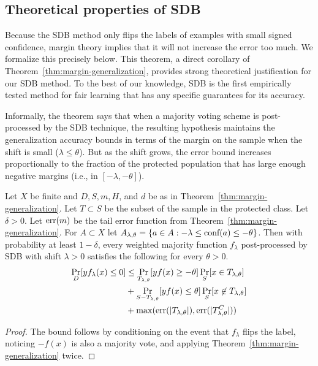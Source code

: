 \documentclass[twoside,leqno,twocolumn]{article}
\begin{document}
\subsection{Theoretical properties of SDB}\label{sec:sdbtheory}

Because the SDB method only flips the labels of examples with small signed
confidence, margin theory implies that it will not increase the error too much.
We formalize this precisely below. This theorem, a direct
corollary of Theorem~\ref{thm:margin-generalization}, provides strong
theoretical justification for our SDB method. To the best of our knowledge,
SDB is the first empirically tested method for fair learning that has any
specific guarantees for its accuracy.

Informally, the theorem says that when a
majority voting scheme is post-processed by the SDB technique, the resulting
hypothesis maintains the generalization accuracy bounds in terms of the margin
on the sample when the shift is small ($\lambda \leq \theta$). But as the shift
grows, the error bound increases proportionally to the fraction of the
protected population that has large enough negative margins (i.e., in
$[-\lambda, -\theta]$).

\begin{theorem} 
Let $X$ be finite and $D,S,m,H$, and $d$ be as in
Theorem~\ref{thm:margin-generalization}. Let $T \subset S$ be the subset of the
sample in the protected class. Let $\delta > 0$. Let $\textup{err}(m)$ be the
tail error function from Theorem~\ref{thm:margin-generalization}. For $A
\subset X$ let $A_{\lambda, \theta} = \{ a \in A : -\lambda \leq
\textup{conf}(a) \leq -\theta \}$. Then with probability at least $1-\delta$,
every weighted majority function $f_\lambda$ post-processed by SDB with shift
$\lambda > 0$ satisfies the following for every $\theta > 0$.
$$
\begin{aligned}\Pr_D[yf_\lambda(x) \leq 0] &\leq 
\Pr_{T_{\lambda, \theta}}[yf(x) \geq -\theta] \Pr_{S}[x \in T_{\lambda,
\theta}] \\ & + 
\Pr_{S - T_{\lambda, \theta}}[yf(x) \leq \theta] \Pr_{S}[x \not \in T_{\lambda,
\theta}] \\ & + 
\max ( \textup{err}(|T_{\lambda, \theta}|), \textup{err}(|T^C_{\lambda,
\theta}|))
\end{aligned}
$$  
\end{theorem}
\begin{proof}
The bound follows by conditioning on the event that $f_\lambda$ flips the
label, noticing $-f(x)$ is also a majority vote, and applying
Theorem~\ref{thm:margin-generalization} twice.  
\end{proof}
\end{document}
